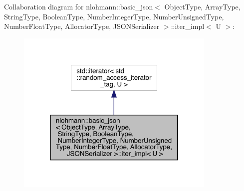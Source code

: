 Collaboration diagram for nlohmann\+::basic\+\_\+json$<$ Object\+Type, Array\+Type, String\+Type, Boolean\+Type, Number\+Integer\+Type, Number\+Unsigned\+Type, Number\+Float\+Type, Allocator\+Type, J\+S\+O\+N\+Serializer $>$\+::iter\+\_\+impl$<$ U $>$\+:
\nopagebreak
\begin{figure}[H]
\begin{center}
\leavevmode
\includegraphics[width=271pt]{classnlohmann_1_1basic__json_1_1iter__impl__coll__graph}
\end{center}
\end{figure}
